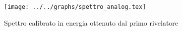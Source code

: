 \begin{figure}[h] \centering\texttt{[image: ../../graphs/spettro\_analog.tex]}\caption{Spettro calibrato in energia ottenuto dal primo rivelatore }\label{gr:spettro_analog} \end{figure}
